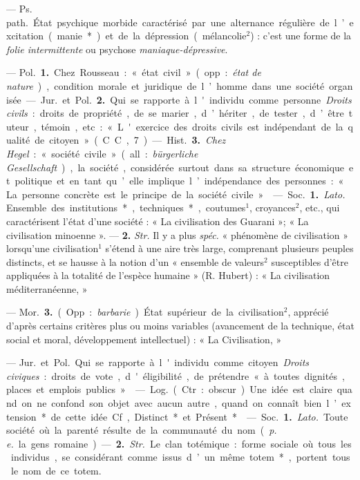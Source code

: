 \begin{itemize}[leftmargin=1cm, label=, itemsep=11pt]
 — \si{Ps. path.} État
psychique morbide caractérisé par
une alternance régulière de l’excitation (manie*) et de la dépression
(mélancolie$^2$) : c’est une forme de la
{\it folie intermittente} ou psychose {\it maniaque-dépressive}.

 — \si{Pol.} {\bf 1.} Chez Rousseau : « état
civil » (opp. : {\it état de nature}), condition morale et juridique de l’homme
dans une société organisée.

— \si{Jur.} et \si{Pol.} {\bf 2.} Qui se rapporte
à l'individu comme personne. {\it Droits
civils} : droits de propriété, de se
marier, d’hériter, de tester, d’être
tuteur, témoin, etc. : « L'exercice
des droits civils est indépendant de
la qualité de citoyen » (C. C., 7).

— \si{Hist.} {\bf 3.} {\it Chez Hegel} : « société
civile » (all. : {\it bürgerliche Gesellschaft}),
la société, considérée surtout dans
sa structure économique et politique
et en tant qu’elle implique l’indépendance des personnes : « La personne concrète est le principe de la
société civile ».

 — \si{Soc.} {\bf 1.}  {\it Lato.} Ensemble
des institutions*, techniques*, coutumes$^1$, croyances$^2$, etc., qui caractérisent l’état d’une société : « La
civilisation des Guarani »; « La
civilisation minoenne ». — {\bf 2.}  {\it Str.}
Il y a plus  {\it spéc.} « phénomène de
civilisation » lorsqu'une civilisation$^1$
s’étend à une aire très large, comprenant plusieurs peuples distincts, et
se hausse à la notion d’un « ensemble
de valeurs$^2$ susceptibles d’être appliquées à la totalité de l'espèce
humaine » (R. Hubert) : « La civilisation méditerranéenne, »

— \si{Mor.} {\bf 3.} (Opp. : {\it barbarie}.) État
supérieur de la civilisation$^2$, apprécié d’après certains critères plus ou
moins variables (avancement de la
technique, état social et moral, développement intellectuel) : « La Civilisation, »

 — \si{Jur.} et \si{Pol.} Qui se rapporte à l'individu comme citoyen.
{\it Droits civiques} : droits de vote,
d'éligibilité, de prétendre « à toutes
dignités, places et emplois publics ».

 — \si{Log.} (Ctr. : obscur). Une idée
est claire quand on ne confond son
objet avec aucun autre, quand on
connaît bien l’extension* de cette
idée. Cf, Distinct* et Présent*.

 — \si{Soc.} {\bf 1.}  {\it Lato.} Toute société
où la parenté résulte de la communauté du nom ({\it p. e.} la gens romaine).
— {\bf 2.}  {\it Str.} Le clan totémique : forme
sociale où tous les individus, se
considérant comme issus d’un même
totem*, portent tous le nom de ce
totem.


\end{itemize}
